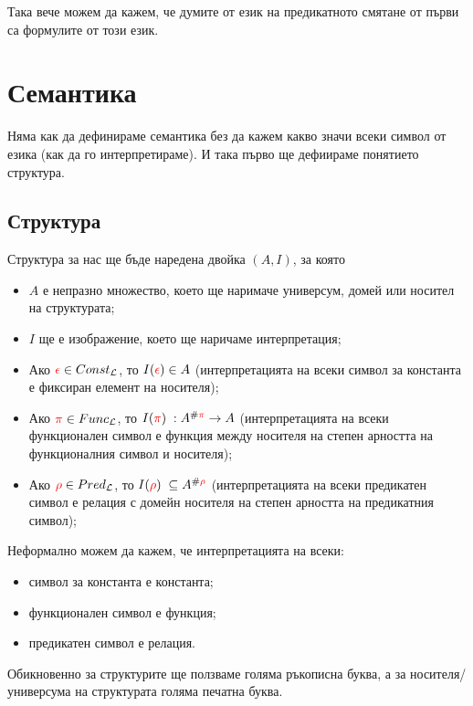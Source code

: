 \documentclass{article}[12pt]
\newcommand{\Lang}{\mathcal{L}}
\begin{document}
Така вече можем да кажем, че думите от език на предикатното смятане от първи са формулите от този език.

\section{Семантика}

Няма как да дефинираме семантика без да кажем какво значи всеки символ от езика
(как да го интерпретираме).
И така първо ще дефиираме понятието структура.

\subsection{Структура}
Структура за нас ще бъде наредена двойка \((A, I)\), за която

\begin{itemize}
\item \(A\) е непразно множество, което ще наримаче универсум, домей или носител на структурата;
\item \(I\) ще е изображение, което ще наричаме интерпретация;
\item Ако \(\color{red} \epsilon \color{black} \in Const_\Lang\),
то \(I(\color{red} \epsilon \color{black}) \in A\) (интерпретацията на всеки символ за константа е фиксиран елемент на носителя);
\item Ако \(\color{red} \pi \color{black} \in Func_\Lang\),
то \(I(\color{red} \pi \color{black}) \; : A^{\#\color{red} \pi} \color{black} \to A\) (интерпретацията на всеки функционален символ е функция между носителя на степен арността на функционалния символ и носителя);
\item Ако \(\color{red} \rho \color{black} \in Pred_\Lang\),
то \(I(\color{red} \rho \color{black}) \; \subseteq A^{\#\color{red} \rho}\) (интерпретацията на всеки предикатен символ е релация с домейн носителя на степен арността на предикатния символ);
\end{itemize}

Неформално можем да кажем, че интерпретацията на всеки:

\begin{itemize}
\item символ за константа е константа;
\item функционален символ е функция;
\item предикатен символ е релация.
\end{itemize}

Обикновенно за структурите ще ползваме голяма ръкописна буква,
а за носителя/универсума на структурата голяма печатна буква.
\end{document}
